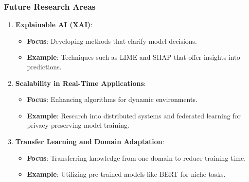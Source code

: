 \documentclass[aspectratio=169]{beamer}
\begin{document}
\begin{frame}[fragile]
    \frametitle{Future Research Areas}
    \begin{enumerate}
        \item \textbf{Explainable AI (XAI)}:
            \begin{itemize}
                \item \textbf{Focus}: Developing methods that clarify model decisions.
                \item \textbf{Example}: Techniques such as LIME and SHAP that offer insights into predictions.
            \end{itemize}

        \item \textbf{Scalability in Real-Time Applications}:
            \begin{itemize}
                \item \textbf{Focus}: Enhancing algorithms for dynamic environments.
                \item \textbf{Example}: Research into distributed systems and federated learning for privacy-preserving model training.
            \end{itemize}

        \item \textbf{Transfer Learning and Domain Adaptation}:
            \begin{itemize}
                \item \textbf{Focus}: Transferring knowledge from one domain to reduce training time.
                \item \textbf{Example}: Utilizing pre-trained models like BERT for niche tasks.
            \end{itemize}
    \end{enumerate}
\end{frame}
\end{document}
